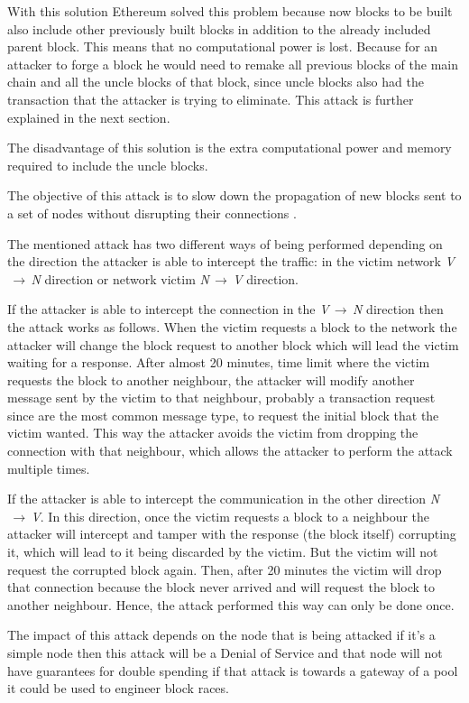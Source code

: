 With this solution Ethereum solved this problem because now blocks to be built also include other previously built blocks in addition to the already included parent block. This means that no computational power is lost. Because for an attacker to forge a block he would need to remake all previous blocks of the main chain and all the uncle blocks of that block, since uncle blocks also had the transaction that the attacker is trying to eliminate. This attack is further explained in the next section.

The disadvantage of this solution is the extra computational power and memory required to include the uncle blocks.


\label{sec:delay}
The objective of this attack is to slow down the propagation of new blocks sent to a set of nodes without disrupting their connections \cite{apostolaki2016hijacking}.

The mentioned attack has two different ways of being performed depending on the direction the attacker is able to intercept the traffic: in the victim network \textit{V$\,\to\,$N} direction or network victim \textit{N$\,\to\,$V} direction.

If the attacker is able to intercept the connection in the \textit{V$\,\to\,$N} direction then the attack works as follows. When the victim requests a block to the network the attacker will change the block request to another block which will lead the victim waiting for a response. After almost 20 minutes, time limit where the victim requests the block to another neighbour, the attacker will modify another message sent by the victim to that neighbour, probably a transaction request since are the most common message type, to request the initial block that the victim wanted. This way the attacker avoids the victim from dropping the connection with that neighbour, which allows the attacker to perform the attack multiple times.

If the attacker is able to intercept the communication in the other direction \textit{N$\,\to\,$V}. In this direction, once the victim requests a block to a neighbour the attacker will intercept and tamper with the response (the block itself) corrupting it, which will lead to it being discarded by the victim. But the victim will not request the corrupted block again. Then, after 20 minutes the victim will drop that connection because the block never arrived and will request the block to another neighbour. Hence, the attack performed this way can only be done once.

The impact of this attack depends on the node that is being attacked if it's a simple node then this attack will be a Denial of Service and that node will not have guarantees for double spending if that attack is towards a gateway of a pool it could be used to engineer block races.

